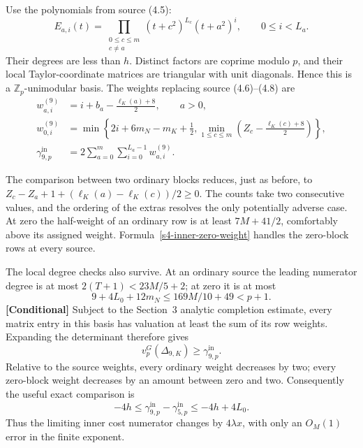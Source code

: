 Use the polynomials from source (4.5):
\begin{equation}
 E_{a,i}(t)=\prod_{\substack{0\leq c\leq m\\c\ne a}}
 (t+c^2)^{L_c}(t+a^2)^i,
 \qquad 0\leq i<L_a.
 \label{s4-inner-basis}
\end{equation}
Their degrees are less than $h$.  Distinct factors are coprime modulo
$p$, and their local Taylor-coordinate matrices are triangular with
unit diagonals.  Hence this is a $\mathbb Z_p$-unimodular basis.
The weights replacing source (4.6)--(4.8) are
\begin{align}
 w^{(9)}_{a,i}&=i+b_a-\frac{\ell_K(a)+8}{2},\qquad a>0,
 \label{s4-inner-weights}\\
 w^{(9)}_{0,i}&=\min\left\{
 2i+6m_N-m_K+\frac12,
 \min_{1\leq c\leq m}\left(Z_c-\frac{\ell_K(c)+8}{2}\right)
 \right\},
 \label{s4-inner-zero-weight}\\
 \gamma^{\mathrm{in}}_{9,p}&=
 2\sum_{a=0}^{m}\sum_{i=0}^{L_a-1}w^{(9)}_{a,i}.
 \label{s4-inner-gamma}
\end{align}

The comparison between two ordinary blocks reduces, just as before,
to
$Z_c-Z_a+1+(\ell_K(a)-\ell_K(c))/2\geq0$.
The counts take two consecutive values, and the ordering of the
extras resolves the only potentially adverse case.  At zero the
half-weight of an ordinary row is at least $7M+41/2$, comfortably
above its assigned weight.  Formula~\eqref{s4-inner-zero-weight}
handles the zero-block rows at every source.

The local degree checks also survive.  At an ordinary source the
leading numerator degree is at most $2(T+1)<23M/5+2$; at zero it is
at most
\[
 9+4L_0+12m_N\leq169M/10+49<p+1.
\]
\textbf{[Conditional]}
Subject to the Section~3 analytic completion estimate, every matrix
entry in this basis has valuation at least the sum of its row
weights.  Expanding the determinant therefore gives
\begin{equation}
 v_p^G(\Delta_{9,K})\geq\gamma^{\mathrm{in}}_{9,p}.
 \label{s4-inner-bound}
\end{equation}
Relative to the source weights, every ordinary weight decreases by
two; every zero-block weight decreases by an amount between zero
and two.  Consequently the useful exact comparison is
\begin{equation}
 -4h\leq\gamma^{\mathrm{in}}_{9,p}-\gamma^{\mathrm{in}}_{5,p}
 \leq-4h+4L_0.
 \label{s4-inner-shift}
\end{equation}
Thus the limiting inner cost numerator changes by $4\lambda x$,
with only an $O_M(1)$ error in the finite exponent.

